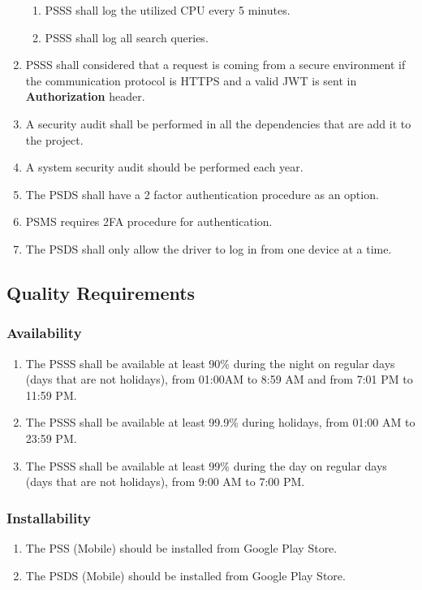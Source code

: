\begin{enumerate}[label=SEC-\arabic*]
\begin{enumerate}[label=SEC-11.\arabic*]
        \item PSSS shall log the utilized CPU every 5 minutes.
        \item PSSS shall log all search queries.
    \end{enumerate}
    \item PSSS shall considered that a request is coming from a secure 
    environment if the communication protocol is HTTPS and a 
    valid JWT \cite{jwt} is sent in \textbf{Authorization} header.
    \item A security audit shall be performed in all the dependencies that 
    are add it to the project.
    \item A system security audit should be performed each year.
    \item The PSDS shall have a 2 factor authentication procedure as an option.
    \item PSMS requires 2FA procedure for authentication.
    \item The PSDS shall only allow the driver to log in from one 
    device at a time.
\end{enumerate}
\pagebreak
\subsection{Quality Requirements}
\subsubsection{Availability}
\begin{enumerate}[label=AVL-\arabic*]
    \item The PSSS shall be available at least 90\% during 
    the night on regular days (days that are not holidays), from 
    01:00AM to 8:59 AM and from 7:01 PM to 11:59 PM.
    \item The PSSS shall be available at least 99.9\% during holidays, 
    from 01:00 AM to 23:59 PM.
    \item The PSSS shall be available at least 99\% during the day on regular 
    days (days that are not holidays), from 9:00 AM to 7:00 PM.
\end{enumerate}

\subsubsection{Installability}
\begin{enumerate}[label=INS-\arabic*]
    \item The PSS (Mobile) should be installed from Google Play Store.
    \item The PSDS (Mobile) should be installed from Google Play Store.
\end{enumerate}

